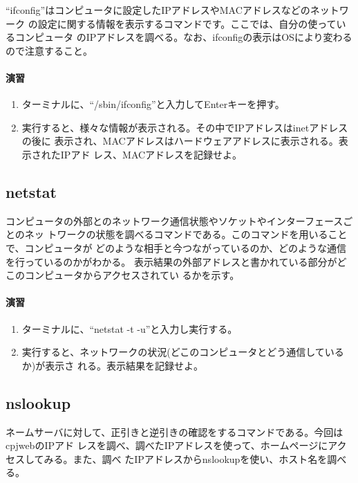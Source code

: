``ifconfig''はコンピュータに設定したIPアドレスやMACアドレスなどのネットワーク
の設定に関する情報を表示するコマンドです。ここでは、自分の使っているコンピュータ
のIPアドレスを調べる。なお、ifconfigの表示はOSにより変わるので注意すること。

\paragraph{演習}
\begin{enumerate}
\item ターミナルに、``/sbin/ifconfig''と入力してEnterキーを押す。
\item 実行すると、様々な情報が表示される。その中でIPアドレスはinetアドレスの後に
      表示され、MACアドレスはハードウェアアドレスに表示される。表示されたIPアド
      レス、MACアドレスを記録せよ。
\end{enumerate}

\subsection{netstat}
コンピュータの外部とのネットワーク通信状態やソケットやインターフェースごとのネッ
トワークの状態を調べるコマンドである。このコマンドを用いることで、コンピュータが
どのような相手と今つながっているのか、どのような通信を行っているのかがわかる。
表示結果の外部アドレスと書かれている部分がどこのコンピュータからアクセスされてい
るかを示す。

\paragraph{演習}
\begin{enumerate}
\item ターミナルに、``netstat -t -u''と入力し実行する。
\item 実行すると、ネットワークの状況(どこのコンピュータとどう通信しているか)が表示さ
      れる。表示結果を記録せよ。
\end{enumerate}


\subsection{nslookup}
ネームサーバに対して、正引きと逆引きの確認をするコマンドである。今回はcpjwebのIPアド
レスを調べ、調べたIPアドレスを使って、ホームページにアクセスしてみる。また、調べ
たIPアドレスからnslookupを使い、ホスト名を調べる。

